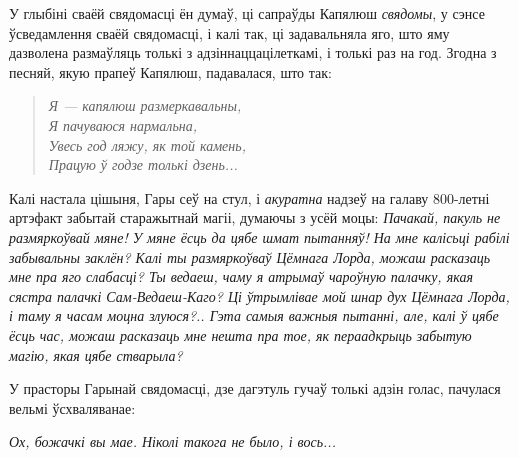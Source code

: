 У глыбіні сваёй свядомасці ён думаў, ці сапраўды Капялюш \emph{свядомы},
у сэнсе ўсведамлення сваёй свядомасці, і калі так, ці задавальняла яго,
што яму дазволена размаўляць толькі з адзіннаццацілеткамі, і толькі раз на год. 
Згодна з песняй, якую прапеў Капялюш, падавалася, што так:

\begin{verse}%
    \itshape
    Я --- капялюш размеркавальны,\\
    Я пачуваюся нармальна,\\
    Увесь год ляжу, як той камень,\\
    Працую ў годзе толькі дзень...
\end{verse}

Калі настала цішыня, Гары сеў на стул, і \emph{акуратна} надзеў на галаву 
800-летні артэфакт забытай старажытнай магіі, думаючы з усёй моцы: 
\emph{Пачакай, пакуль не размяркоўвай мяне! У мяне ёсць да цябе шмат  
пытанняў! На мне калісьці рабілі забывальны заклён? Калі ты размяркоўваў Цёмнага Лорда,
можаш расказаць мне пра яго слабасці? Ты ведаеш, чаму я атрымаў чароўную палачку,
якая сястра палачкі Сам-Ведаеш-Каго? Ці ўтрымлівае мой шнар дух Цёмнага Лорда,
і таму я часам моцна злуюся?.. Гэта самыя важныя пытанні, але, калі ў цябе ёсць час,
можаш расказаць мне нешта пра тое, як пераадкрыць забытую магію, якая цябе стварыла?}

У прасторы Гарынай свядомасці, дзе дагэтуль гучаў толькі адзін голас, 
пачулася вельмі ўсхваляванае:

\emph{Ох, божачкі вы мае. Ніколі такога не было, і вось...}
